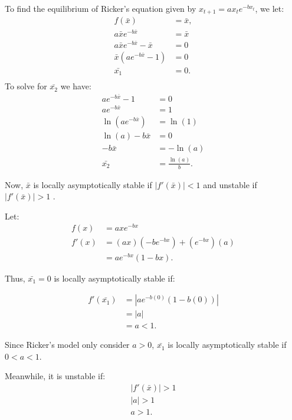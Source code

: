 \documentclass [a4paper]{article}
\begin{document}
To find the equilibrium of Ricker's equation given by \( x_{t + 1} = ax_{t}e^{-bx_{t}}\), we let: \\

\begin{align*}
f(\bar{x}) &= \bar{x}, \\
a\bar{x}e^{-b\bar{x}} &= \bar{x}\\
a\bar{x}e^{-b\bar{x}} - \bar{x} &= 0\\
\bar{x}(ae^{-b\bar{x}} - 1) &= 0\\
\bar{x_1} &= 0. \\
\end{align*}
To solve for \(\bar{x_2}\) we have: 
\begin{align*}
ae^{-b\bar{x}} - 1 &= 0\\
ae^{-b\bar{x}} &=  1\\
\ln({ae^{-b\bar{x}}}) &= \ln({1})\\
\ln({a}) - b\bar{x} &= 0\\
- b\bar{x} &= -\ln({a})\\
\bar{x_2} &= \frac{\ln({a})}{b}.
\end{align*}

Now, \(\bar{x}\) is locally asymptotically stable if \(| f'(\bar{x})| < 1\) and unstable if  
\(| f'(\bar{x})| > 1\) . 

Let:\\

\begin{align*}
    f(x) &= axe^{-bx}\\
    f'(x) &= (ax)(-be^{-bx}) + (e^{-bx})(a)\\
    &= ae^{-bx}(1-bx).
\end{align*}

Thus, \(\bar{x_1} = 0\) is locally asymptotically stable if: 

\begin{align*}
    f'(\bar{x_1}) &= |ae^{-b(0)}(1-b(0))|\\
    &= |a|\\
    &= a < 1.
\end{align*}

Since Ricker's model only consider \(a > 0\), \(\bar{x_1}\) is locally asymptotically stable if \(0< a < 1\). 

Meanwhile, it is unstable if: \\

\begin{align*}
| f'(\bar{x})| > 1\\
|a| > 1\\
a > 1.
\end{align*}
\end{document}
